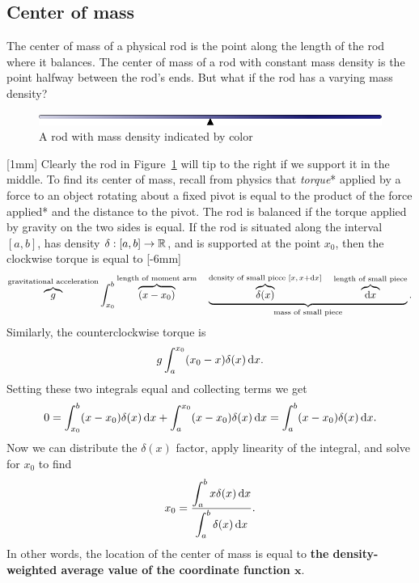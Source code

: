 \documentclass{watsonbook}
\begin{document}
\subsection{Center of mass}

The center of mass of a physical rod is the point along the length of
the rod where it balances. The center of mass of a rod with constant
mass density is the point halfway between the rod's ends. But what if
the rod has a varying mass density?

\begin{figure}[h!]
  \centering
  \includegraphics[width=12cm]{figures/centerofmass}
  \caption{A rod with mass density indicated by color}
  \label{fig:rod} 
\end{figure}

[1mm] Clearly the rod in Figure~\ref{fig:rod} will tip to
the right if we support it in the middle. To find its center of mass,
recall from physics that \textit{torque}* applied by a force to an
object rotating about a fixed pivot is equal to the product of the
force applied* and the distance to the pivot. The rod is balanced if
the torque applied by gravity on the two sides is equal. If the rod is
situated along the interval $[a,b]$, has density
$\delta:[a,b] \to \mathbb{R}$, and is supported at the point $x_0$, then the
clockwise torque is equal to [-6mm]
\[
  \overbrace{g}^{\text{gravitational acceleration}}\int_{x_0}^b \overbrace{(x-x_0)}^{\text{length of moment arm}} \quad \underbrace{\overbrace{\delta(x)}^{\text{density of small piece }[x,\, x+\mathrm{d} x]} \quad  \overbrace{\mathrm{d} x}^{\text{length of small piece}}}_{\text{mass of small piece}}. 
\]
Similarly, the counterclockwise torque is 
\[
  g\int_{a}^{x_0} (x_0-x)\delta(x) \, \mathrm{d} x. 
\]
Setting these two integrals equal and collecting terms we get 
\[
  0 = \int_{x_0}^{b} (x-x_0)\delta(x) \, \mathrm{d} x + \int_{a}^{x_0} (x-x_0)\delta(x) \, \mathrm{d} x =
  \int_{a}^{b} (x-x_0)\delta(x) \, \mathrm{d} x. 
\]
Now we can distribute the $\delta(x)$ factor, apply linearity of the integral, and solve for $x_0$ to find
\[
  x_0 = \frac{\displaystyle{\int_a^b x \delta(x) \, \mathrm{d}x}}{\displaystyle{\int_a^b \delta(x) \, \mathrm{d}x}}. 
\]
In other words, the location of the center of mass is equal to \textbf{the density-weighted average value of the coordinate function $\bm{x}$}.
\end{document}
